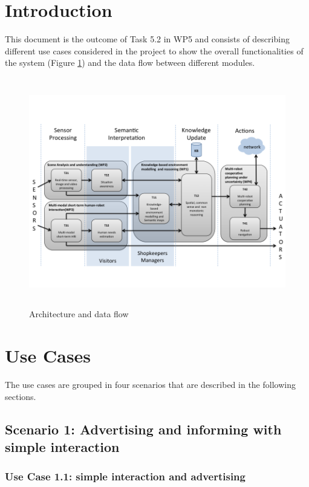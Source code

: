 \section{Introduction}

This document is the outcome of Task 5.2 in WP5 and consists of describing different use cases considered in the project to show the overall functionalities of the system (Figure \ref{Fig-1}) and the data flow between different modules. 
\begin{figure}[htbp]
\begin{center}
\includegraphics[height=10cm]{ArchitectureCoachesDF}
\caption{Architecture and data flow }
\label{Fig-1}
\end{center}
\end{figure}

\section{Use Cases}

The use cases are grouped in four scenarios that are described in the following sections.

\subsection{Scenario 1: Advertising and informing with simple interaction} 

\subsubsection*{Use Case 1.1: simple interaction and advertising} 

